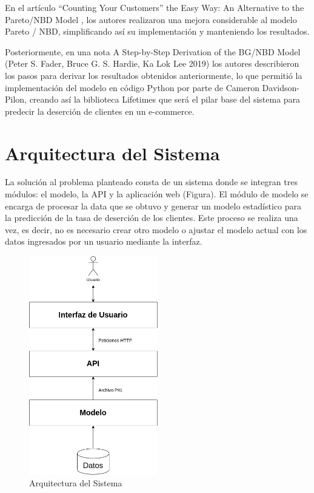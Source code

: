 	En el artículo “Counting Your Customers” the Easy Way: An Alternative to the Pareto/NBD Model \cite{fader2005}, los autores realizaron una mejora considerable al modelo Pareto / NBD, simplificando así su implementación y manteniendo los resultados.

	Posteriormente, en una nota A Step-by-Step Derivation of the BG/NBD Model (Peter S. Fader, Bruce G. S. Hardie, Ka Lok Lee 2019) los autores describieron los pasos para derivar los resultados obtenidos anteriormente, lo que permitió la implementación del modelo en código Python por parte de Cameron Davidson-Pilon, creando así la biblioteca Lifetimes que será el pilar base del sistema para predecir la deserción de clientes en un e-commerce.

\section{Arquitectura del Sistema}

La solución al problema planteado consta de un sistema donde se integran tres módulos: el modelo, la API y la aplicación web (Figura). El módulo de modelo se encarga de procesar la data que se obtuvo y generar un modelo estadístico para la predicción de la tasa de deserción de los clientes. Este proceso se realiza una vez, es decir, no es necesario crear otro modelo o ajustar el modelo actual con los datos ingresados por un usuario mediante la interfaz.

\begin{figure}[H]
	\centering \includegraphics[width=0.50\textwidth]{images/arquitectura-proyecto-de-grado.png}
	\caption{Arquitectura del Sistema}
	\label{fig:arq}
\end{figure}


